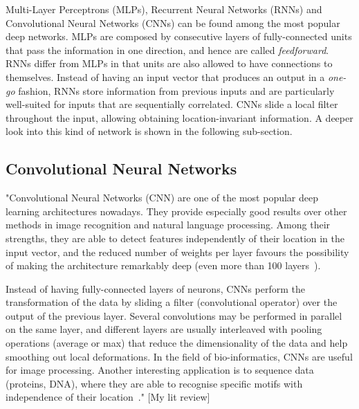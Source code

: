 Multi-Layer Perceptrons (MLPs), Recurrent Neural Networks (RNNs) and Convolutional Neural Networks (CNNs) can be found among the most popular deep networks. MLPs are composed by consecutive layers of fully-connected units that pass the information in one direction, and hence are called \textit{feedforward}. RNNs differ from MLPs in that units are also allowed to have connections to themselves. Instead of having an input vector that produces an output in a \textit{one-go} fashion, RNNs store information from previous inputs and are particularly well-suited for inputs that are sequentially correlated. CNNs slide a local filter throughout the input, allowing obtaining location-invariant information. A deeper look into this kind of network is shown in the following sub-section.

	\subsection{Convolutional Neural Networks}
	
	
	"Convolutional Neural Networks (CNN) are one of the most popular deep learning architectures nowadays. They provide especially good results over other methods in image recognition and natural language processing. Among their strengths, they are able to detect features independently of their location in the input vector, and the reduced number of weights per layer favours the possibility of making the architecture remarkably deep (even more than 100 layers~\cite{He2015}).
	
	Instead of having fully-connected layers of neurons, CNNs perform the transformation of the data by sliding a filter (convolutional operator) over the output of the previous layer. Several convolutions may be performed in parallel on the same layer, and different layers are usually interleaved with pooling operations (average or max) that reduce the dimensionality of the data and help smoothing out local deformations.
	In the field of bio-informatics, CNNs are useful for image processing. Another interesting application is to sequence data (proteins, DNA), where they are able to recognise specific motifs with independence of their location~\cite{Jurtz2017}." [My lit review]
	
